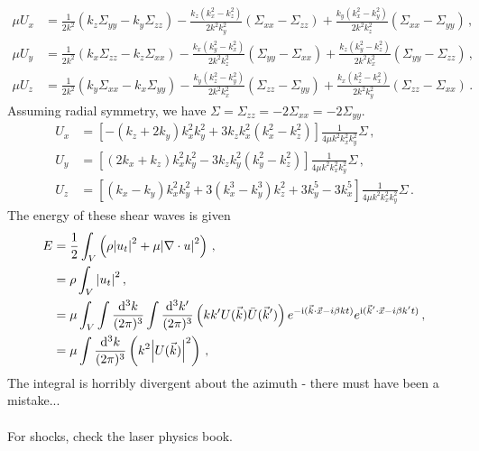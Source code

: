 \documentclass{article}
\newcommand*\diff{\mathop{}\!\mathrm{d}}
\newcommand*\te[1]{\text{#1}}
\newcommand*\p[1]{\left(#1\right)}
\newcommand*\ps[1]{\left[#1\right]}
\newcommand*\f[2]{\frac{#1}{#2}}
\newcommand*\I{\te{i}}
\begin{document}
\begin{align}
\mu U_x&=\f{1}{2k^2}(k_z\Sigma_{yy}-k_y\Sigma_{zz})-\f{k_z(k_x^2-k_z^2)}{2k^2k_y^2}(\Sigma_{xx}-\Sigma_{zz})+\f{k_y(k_x^2-k_y^2)}{2k^2k_z^2}(\Sigma_{xx}-\Sigma_{yy})\,,\\
\mu U_y&=\f{1}{2k^2}(k_x\Sigma_{zz}-k_z\Sigma_{xx})-\f{k_x(k_y^2-k_x^2)}{2k^2k_z^2}(\Sigma_{yy}-\Sigma_{xx})+\f{k_z(k_y^2-k_z^2)}{2k^2k_x^2}(\Sigma_{yy}-\Sigma_{zz})\,,\\
\mu U_z&=\f{1}{2k^2}(k_y\Sigma_{xx}-k_x\Sigma_{yy})-\f{k_y(k_z^2-k_y^2)}{2k^2k_x^2}(\Sigma_{zz}-\Sigma_{yy})+\f{k_x(k_z^2-k_x^2)}{2k^2k_y^2}(\Sigma_{zz}-\Sigma_{xx})\,.
\end{align}
Assuming radial symmetry, we have $\Sigma=\Sigma_{zz}=-2\Sigma_{xx}=-2\Sigma_{yy}$.
\begin{align}
U_x&=\ps{-(k_z+2k_y)k_x^2k_y^2+3k_zk_x^2(k_x^2-k_z^2)}\f{1}{4\mu k^2k_x^2k_y^2}\Sigma\,,\\
U_y&=\ps{(2k_x+k_z)k_x^2k_y^2-3k_zk_y^2(k_y^2-k_z^2)}\f{1}{4\mu k^2k_x^2k_y^2}\Sigma\,,\\
U_z&=\ps{(k_x-k_y)k_x^2k_y^2+3(k_x^3-k_y^3)k_z^2+3k_y^5-3k_x^5}\f{1}{4\mu k^2k_x^2k_y^2}\Sigma\,.
\end{align}
The energy of these shear waves is given
\begin{align}
E&=\f12\int_V\p{\rho\abs{u_t}^2+\mu\abs{\nabla\cdot u}^2}\,,\\
&=\rho\int_V\abs{u_t}^2\,,\\
&=\mu\int_V\int\f{\diff^3 k}{(2\pi)^3}\int\f{\diff^3 k'}{(2\pi)^3}\p{k k'U(\vec k)\bar U(\vec k')}e^{-\I(\vec k\cdot\vec x-i\beta k t)}e^{\I(\vec k'\cdot\vec x-i\beta k' t)}\,,\\
&=\mu\int\f{\diff^3 k}{(2\pi)^3}\p{k^2\abs{U(\vec k)}^2}\,,\\
\end{align}
The integral is horribly divergent about the azimuth - there must have been a mistake...
\\\\
For shocks, check the laser physics book.


\pagebreak
\end{document}
